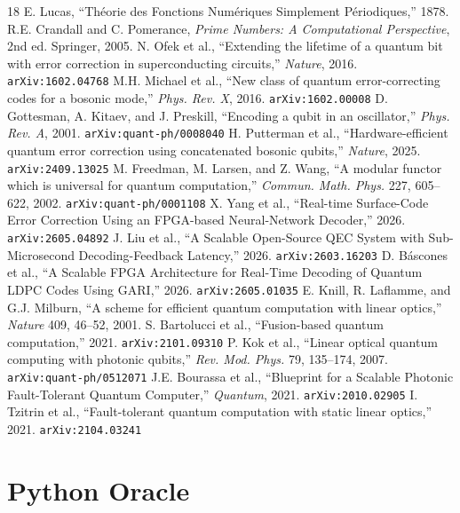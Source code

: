 \documentclass[conference]{IEEEtran}
\begin{document}
\begin{thebibliography}{18}
 E. Lucas, ``Th\'eorie des Fonctions Num\'eriques Simplement P\'eriodiques,'' 1878.
 R.E. Crandall and C. Pomerance, \textit{Prime Numbers: A Computational Perspective}, 2nd ed. Springer, 2005.
 N. Ofek et al., ``Extending the lifetime of a quantum bit with error correction in superconducting circuits,'' \textit{Nature}, 2016. \texttt{arXiv:1602.04768}
 M.H. Michael et al., ``New class of quantum error-correcting codes for a bosonic mode,'' \textit{Phys. Rev. X}, 2016. \texttt{arXiv:1602.00008}
 D. Gottesman, A. Kitaev, and J. Preskill, ``Encoding a qubit in an oscillator,'' \textit{Phys. Rev. A}, 2001. \texttt{arXiv:quant-ph/0008040}
 H. Putterman et al., ``Hardware-efficient quantum error correction using concatenated bosonic qubits,'' \textit{Nature}, 2025. \texttt{arXiv:2409.13025}
 M. Freedman, M. Larsen, and Z. Wang, ``A modular functor which is universal for quantum computation,'' \textit{Commun. Math. Phys.} 227, 605--622, 2002. \texttt{arXiv:quant-ph/0001108}
 X. Yang et al., ``Real-time Surface-Code Error Correction Using an FPGA-based Neural-Network Decoder,'' 2026. \texttt{arXiv:2605.04892}
 J. Liu et al., ``A Scalable Open-Source QEC System with Sub-Microsecond Decoding-Feedback Latency,'' 2026. \texttt{arXiv:2603.16203}
 D. B\'{a}scones et al., ``A Scalable FPGA Architecture for Real-Time Decoding of Quantum LDPC Codes Using GARI,'' 2026. \texttt{arXiv:2605.01035}
 E. Knill, R. Laflamme, and G.J. Milburn, ``A scheme for efficient quantum computation with linear optics,'' \textit{Nature} 409, 46--52, 2001.
 S. Bartolucci et al., ``Fusion-based quantum computation,'' 2021. \texttt{arXiv:2101.09310}
 P. Kok et al., ``Linear optical quantum computing with photonic qubits,'' \textit{Rev. Mod. Phys.} 79, 135--174, 2007. \texttt{arXiv:quant-ph/0512071}
 J.E. Bourassa et al., ``Blueprint for a Scalable Photonic Fault-Tolerant Quantum Computer,'' \textit{Quantum}, 2021. \texttt{arXiv:2010.02905}
 I. Tzitrin et al., ``Fault-tolerant quantum computation with static linear optics,'' 2021. \texttt{arXiv:2104.03241}
\end{thebibliography}

\clearpage
\appendices
\section{Python Oracle}
\end{document}
